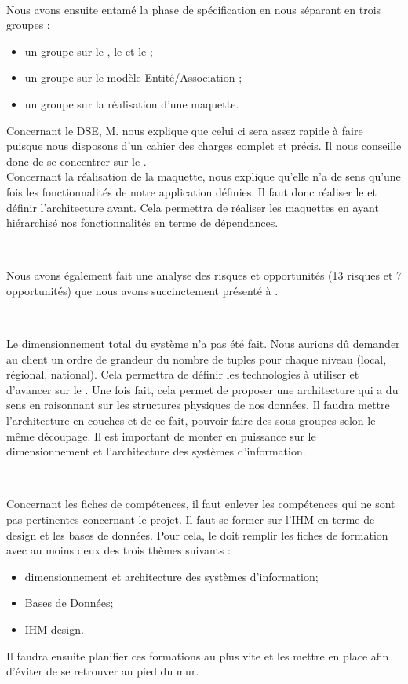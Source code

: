 \documentclass [a4paper] {article}
\begin{document}
~

Nous avons ensuite entamé la phase de spécification en nous séparant en trois groupes : 
\begin{itemize}
\item un groupe sur le \DSE{}, le \DSI{} et le \PTV{} ; 
\item un groupe sur le modèle Entité/Association ;
\item un groupe sur la réalisation d'une maquette.
\end{itemize}

Concernant le DSE, M. \nomTuteurPedago{} nous explique que celui ci sera assez rapide à faire puisque nous disposons d'un cahier des charges complet et précis. Il nous conseille donc de se concentrer sur le \PTV{}.
\\
Concernant la réalisation de la maquette, \nomTuteurPedago{} nous explique qu'elle n'a de sens qu'une fois les fonctionnalités de notre application définies. Il faut donc réaliser le \DSICourt{} et définir l'architecture avant. Cela permettra de réaliser les maquettes en ayant hiérarchisé nos fonctionnalités en terme de dépendances.

~

Nous avons également fait une analyse des risques et opportunités (13 risques et 7 opportunités) que nous avons succinctement présenté à \nomTuteurPedago{}.

~

Le dimensionnement total du système n'a pas été fait. Nous aurions dû demander au client un ordre de grandeur du nombre de tuples pour chaque niveau (local, régional, national). Cela permettra de définir les technologies à utiliser et d'avancer sur le \DSICourt{}. Une fois fait, cela permet de proposer une architecture qui a du sens en raisonnant sur les structures physiques de nos données. Il faudra mettre l'architecture en couches et de ce fait, pouvoir faire des sous-groupes selon le même découpage. Il est important de monter en puissance sur le dimensionnement et l'architecture des systèmes d'information.

~

Concernant les fiches de compétences, il faut enlever les compétences qui ne sont pas pertinentes concernant le projet. Il faut se former sur l'IHM en terme de design et les bases de données. Pour cela, le \RQCourt{} doit remplir les fiches de formation avec au moins deux des trois thèmes suivants :
\begin{itemize}
\item dimensionnement et architecture des systèmes d'information;
\item Bases de Données;
\item IHM design.
\end{itemize}
Il faudra ensuite planifier ces formations au plus vite et les mettre en place afin d'éviter de se retrouver au pied du mur.
\end{document}
